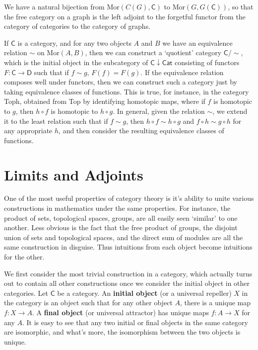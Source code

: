 We have a natural bijection from $\text{Mor}(C(G), \mathsf{C})$ to $\text{Mor}(G, G(\mathsf{C}))$, so that the free category on a graph is the left adjoint to the forgetful functor from the category of categories to the category of graphs.

If $\mathsf{C}$ is a category, and for any two objects $A$ and $B$ we have an equivalence relation $\sim$ on $\text{Mor}(A,B)$, then we can construct a `quotient' category $\mathsf{C}/\sim$, which is the initial object in the subcategory of $\mathsf{C} \downarrow \mathsf{Cat}$ consisting of functors $F: \mathsf{C} \to \mathsf{D}$ such that if $f \sim g$, $F(f) = F(g)$. If the equivalence relation composes well under functors, then we can construct such a category just by taking equivalence classes of functions. This is true, for instance, in the category {\sf Toph}, obtained from {\sf Top} by identifying homotopic maps, where if $f$ is homotopic to $g$, then $h \circ f$ is homotopic to $h \circ g$. In general, given the relation $\sim$, we extend it to the least relation such that if $f \sim g$, then $h \circ f \sim h \circ g$ and $f \circ h \sim g \circ h$ for any appropriate $h$, and then consider the resulting equivalence classes of functions.


\chapter{Limits and Adjoints}

One of the most useful properties of category theory is it's ability to unite various constructions in mathematics under the same properties. For instance, the product of sets, topological spaces, groups, are all easily seen `similar' to one another. Less obvious is the fact that the free product of groups, the disjoint union of sets and topological spaces, and the direct sum of modules are all the same construction in disguise. Thus intuitions from each object become intuitions for the other.

We first consider the most trivial construction in a category, which actually turns out to contain all other constructions once we consider the initial object in other categories. Let $\mathsf{C}$ be a category. An {\bf initial object} (or a universal repeller) $X$ in the category is an object such that for any other object $A$, there is a unique map $f: X \to A$. A {\bf final object} (or universal attractor) has unique maps $f: A \to X$ for any $A$. It is easy to see that any two initial or final objects in the same category are isomorphic, and what's more, the isomorphism between the two objects is unique.

